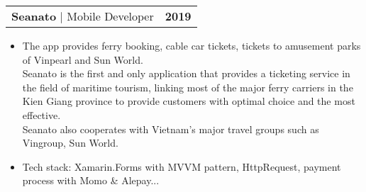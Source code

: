 \documentclass[letterpaper,11pt]{article}
\makeatletter
\newcommand{\resumeItem}[1]{
	\item\small{
		{#1 \vspace{-2pt}}
	}
}
\newcommand{\resumeProjectHeading}[2]{
	\item
	\begin{tabular*}{1.001\textwidth}{l@{\extracolsep{\fill}}r}
		\small#1 & \textbf{\small #2}\\
	\end{tabular*}\vspace{-7pt}
}
\newcommand{\resumeItemListStart}{\begin{itemize}}
\newcommand{\resumeItemListEnd}{\end{itemize}\vspace{-5pt}}
\makeatother
\begin{document}



\resumeProjectHeading
{\textbf{\large{Seanato}} $|$ \large{Mobile Developer}}{2019}
\resumeItemListStart
\resumeItem{\normalsize{The app provides ferry booking, cable car tickets, tickets
		to amusement parks of Vinpearl and Sun World.
		\\Seanato is the first and only application that provides a
		ticketing service in the field of maritime tourism, linking
		most of the major ferry carriers in the Kien Giang province
		to provide customers with optimal choice and the most
		effective.
		\\Seanato also cooperates with Vietnam's major travel groups such as Vingroup, Sun World.}}
\resumeItem{\normalsize{Tech stack: Xamarin.Forms with MVVM pattern, HttpRequest, payment
		process with Momo \& Alepay...}}
\resumeItemListEnd
\vspace{-13pt}
\end{document}
